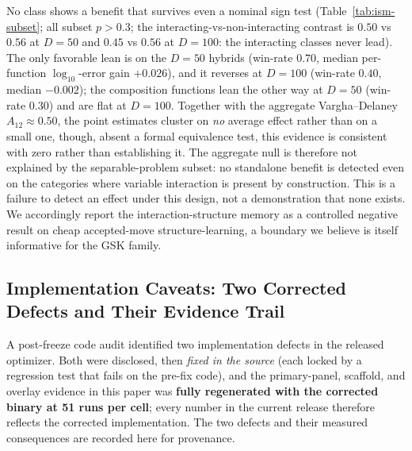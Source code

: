 \documentclass[algorithms,article,submit,moreauthors,pdftex]{Definitions/mdpi}
\begin{document}
No class shows a benefit that survives even a nominal sign test
(Table~\ref{tab:ism-subset}; all subset
$p > 0.3$; the interacting-vs-non-interacting contrast is $0.50$ vs $0.56$ at $D=50$
and $0.45$ vs $0.56$ at $D=100$: the interacting classes never lead).  The only
favorable lean is on the
$D=50$ hybrids (win-rate $0.70$, median per-function $\log_{10}$-error gain $+0.026$),
and it reverses at $D=100$ (win-rate $0.40$, median $-0.002$); the
composition functions lean the other way at $D=50$ (win-rate $0.30$) and are flat
at $D=100$.  Together with the aggregate
Vargha--Delaney $A_{12}\approx 0.50$, the point estimates cluster on \emph{no}
average effect rather than on a small one, though, absent a formal equivalence
test, this evidence is consistent with zero rather than establishing it.  The aggregate null is therefore not explained by the separable-problem
subset: no standalone benefit is detected even on the categories where variable
interaction is present by construction. This is a failure to detect an effect
under this design, not a demonstration that none exists.  We accordingly report the
interaction-structure memory as a controlled negative result on cheap accepted-move
structure-learning, a boundary we believe is itself informative for the GSK family.


\subsection{Implementation Caveats: Two Corrected Defects and Their Evidence Trail}\label{sec:supp:ablation:caveats}

A post-freeze code audit identified two implementation defects in the released
optimizer.  Both were disclosed, then \emph{fixed in the source} (each locked by a
regression test that fails on the pre-fix code), and the primary-panel, scaffold, and
overlay evidence in this paper was \textbf{fully regenerated with the corrected
binary at 51 runs per cell}; every number in the current release therefore reflects
the corrected implementation.  The two defects and their measured consequences are
recorded here for provenance.

\end{document}
